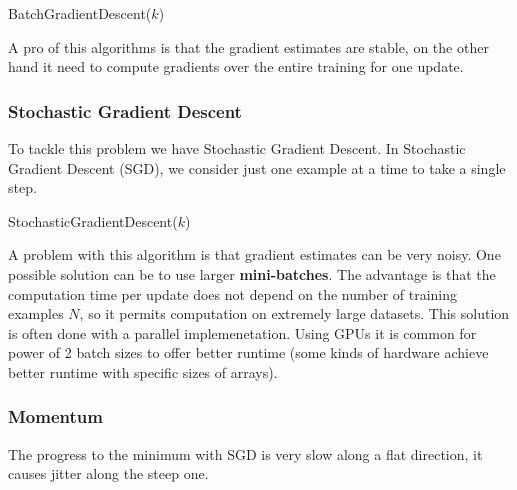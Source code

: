 \begin{algorithm}
    \caption{BatchGradientDescent($k$)}
    \label{alg:batch_gradient_descent}
\end{algorithm}

A pro of this algorithms is that the gradient estimates are stable, on the other hand it need to compute gradients over the entire training for one update.

\subsubsection{Stochastic Gradient Descent}
To tackle this problem we have Stochastic Gradient Descent. In Stochastic Gradient Descent (SGD), we consider just one example at a time to take a single step.

\begin{algorithm}
    \caption{StochasticGradientDescent($k$)}
    \label{alg:stochastic_gradient_descent}

    
\end{algorithm}

A problem with this algorithm is that gradient estimates can be very noisy. One possible solution can be to use larger \textbf{mini-batches}. The advantage is that the computation time per update does not depend on the number of training examples \(N\), so it permits computation on extremely large datasets. This solution is often done with a parallel implemenetation. Using GPUs it is common for power of 2 batch sizes to offer better runtime (some kinds of hardware achieve better runtime with specific sizes of arrays).

\subsubsection{Momentum}
The progress to the minimum with SGD is very slow along a flat direction, it causes jitter along the steep one.

